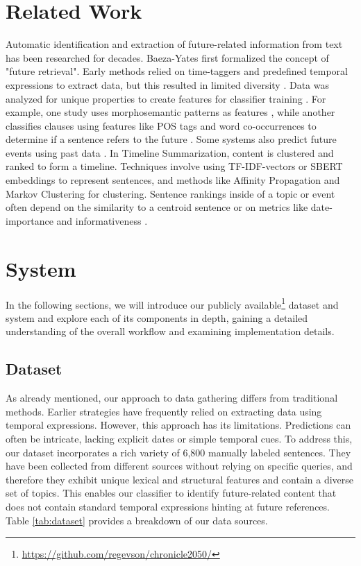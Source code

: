 \documentclass[sigconf]{acmart}
\begin{document}
\section{Related Work}
Automatic identification and extraction of future-related information from text has been researched for decades. Baeza-Yates \cite{BaezaYatesSearchingTF} first formalized the concept of "future retrieval". Early methods relied on time-taggers and predefined temporal expressions to extract data, but this resulted in limited diversity \cite{chronoseeker, supportingAnalysis, analyzingCollective, rankingRelated, extractingCollective}. Data was analyzed for unique properties \cite{improvingRetrieval} to create features for classifier training \cite{computationalExploration}.
For example, one study uses morphosemantic patterns as features \cite{automaticExtraction}, while another classifies clauses using features like POS tags and word co-occurrences to determine if a sentence refers to the future \cite{extractingPredictive}. Some systems also predict future events using past data \cite{miningTheWeb, predictingTheNews}.
In Timeline Summarization, content is clustered and ranked to form a timeline. Techniques involve using TF-IDF-vectors or SBERT embeddings \cite{sbert} to represent sentences, and methods like Affinity Propagation \cite{abstractiveTimeline, multiTimeline} and Markov Clustering \cite{stateOfTheArtTimeline} for clustering. Sentence rankings inside of a topic or event often depend on the similarity to a centroid sentence \cite{stateOfTheArtTimeline} or on metrics like date-importance and informativeness \cite{abstractiveTimeline}.



\section{System}
In the following sections, we will introduce our publicly available\footnote{\url{https://github.com/regevson/chronicle2050/}} dataset and system and explore each of its components in depth, gaining a detailed understanding of the overall workflow and examining implementation details.

\subsection{Dataset}
As already mentioned, our approach to data gathering differs from traditional methods. Earlier strategies have frequently relied on extracting data using temporal expressions. However, this approach has its limitations. Predictions can often be intricate, lacking explicit dates or simple temporal cues.
To address this, our dataset incorporates a rich variety of 6,800 manually labeled sentences. They have been collected from different sources without relying on specific queries, and therefore they exhibit unique lexical and structural features and contain a diverse set of topics. This enables our classifier to identify future-related content that does not contain standard temporal expressions hinting at future references.
Table \ref{tab:dataset} provides a breakdown of our data sources.
\end{document}
